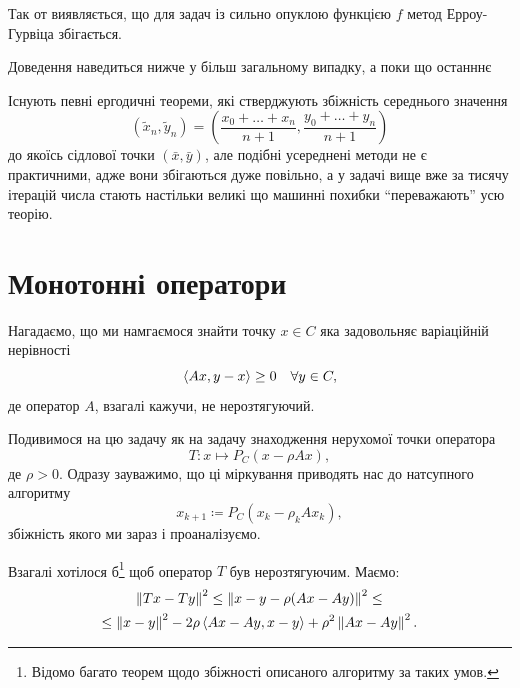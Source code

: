 Так от виявляється, що для задач із сильно опуклою функцією $f$ метод Ерроу-Гурвіца збігається. \medskip

Доведення наведиться нижче у більш загальному випадку, а поки що останннє
\begin{remark}
    Існують певні ергодичні теореми, які стверджують збіжність середнього значення 
    \begin{equation}
        \left(\tilde x_n, \tilde y_n\right) = \left( \frac{x_0 + \ldots + x_n}{n + 1}, \frac{y_0 + \ldots + y_n}{n + 1} \right)
    \end{equation}
    до якоїсь сідлової точки $(\bar x, \bar y)$, але подібні усереднені методи не є практичними, адже вони збігаються дуже повільно, а у задачі вище вже за тисячу ітерацій числа стають настільки великі що машинні похибки ``переважають'' усю теорію.
\end{remark}

\section{Монотонні оператори}

Нагадаємо, що ми намгаємося знайти точку $x \in C$ яка задовольняє варіаційній нерівності
\begin{equation}
    \sp{A x, y - x} \ge 0 \quad \forall y \in C,
\end{equation}
де оператор $A$, взагалі кажучи, не нерозтягуючий. \medskip

Подивимося
на цю задачу як на задачу знаходження нерухомої точки оператора
\begin{equation}
    T: x \mapsto P_C \left( x - \rho A x \right),
\end{equation}
де $\rho > 0$. Одразу зауважимо, що ці міркування приводять нас до натсупного алгоритму
\begin{equation}
    x_{k + 1} \coloneqq P_C \left( x_k - \rho_k A x_k \right),
\end{equation} 
збіжність якого ми зараз і проаналізуємо. \medskip

Взагалі хотілося б\footnote{Відомо багато теорем щодо збіжності описаного алгоритму за таких умов.} щоб оператор $T$ був нерозтягуючим. Маємо:
\begin{multline}
    \no{T x - T y}^2 \le \no{x - y - \rho (A x - A y)}^2 \le \\
    \le \no{x - y}^2 - 2 \rho \sp{A x - A y, x - y} + \rho^2 \no{A x - Ay}^2.
\end{multline}

